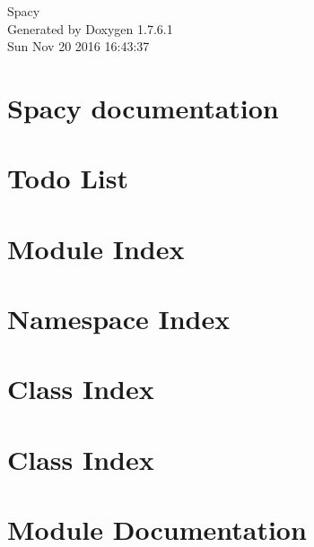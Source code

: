 \documentclass[a4paper]{book}
\begin{document}
\hypersetup{pageanchor=false,citecolor=blue}
\begin{titlepage}
\vspace*{7cm}
\begin{center}
{\Large \-Spacy }\\
\vspace*{1cm}
{\large \-Generated by Doxygen 1.7.6.1}\\
\vspace*{0.5cm}
{\small Sun Nov 20 2016 16:43:37}\\
\end{center}
\end{titlepage}
\clearemptydoublepage
{}
\tableofcontents
\clearemptydoublepage
{}
\hypersetup{pageanchor=true,citecolor=blue}
\chapter{\-Spacy documentation}
\label{index}\hypertarget{index}{}
\chapter{\-Todo \-List}
\label{todo}
\hypertarget{todo}{}

\chapter{\-Module \-Index}

\chapter{\-Namespace \-Index}

\chapter{\-Class \-Index}

\chapter{\-Class \-Index}

\chapter{\-Module \-Documentation}














\end{document}
